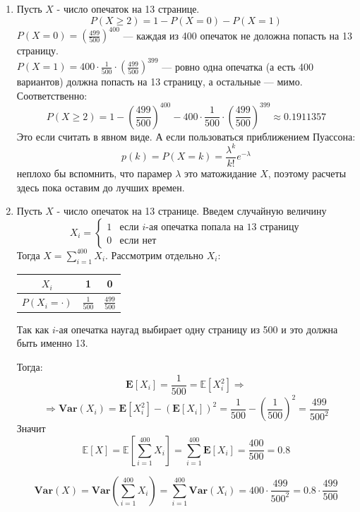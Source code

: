 \documentclass[a4paper,12pt]{article}
\theoremstyle{plain}                         %
\theoremstyle{definition}                  %
\theoremstyle{remark}                      %
\begin{document}
\begin{enumerate}
\item Пусть $X$ - число опечаток на 13 странице. $$P(X \geqslant 2) = 1 - P(X=0) - P(X=1) $$
$P(X=0) = \left( \frac{499}{500} \right)^{400}$ --- каждая из 400 опечаток не доложна попасть на 13 страницу.\\
$P(X=1) = 400\cdot\frac{1}{500}\cdot\left( \frac{499}{500} \right)^{399}$ --- ровно одна опечатка (а есть 400 вариантов) должна попасть на 13 страницу, а остальные --- мимо. Соответственно:
$$
P(X \geqslant 2) = 1 - \left( \frac{499}{500} \right)^{400} - 400\cdot\frac{1}{500}\cdot\left( \frac{499}{500} \right)^{399} \approx 0.1911357
$$
Это если считать в явном виде. А если пользоваться приближением Пуассона: 
$$
p(k) = P(X = k) = \frac{\lambda^k}{k!}e^{-\lambda}
$$
неплохо бы вспомнить, что парамер $\lambda$ это матожидание $X$, поэтому расчеты здесь пока оставим до лучших времен.

\item Пусть $X$ - число опечаток на 13 странице. Введем случайную величину 
$$X_i =
\begin{cases}
1 & \text{если } i\text{-ая опечатка попала на 13 страницу}\\
0 & \text{если нет}
\end{cases}
$$
Тогда $X = \sum\limits_{i=1}^{400}X_i$. Рассмотрим отдельно $X_i$: \hspace{0.5cm}
\begin{minipage}{0.3\linewidth}

\begin{tabular}{c|c|c}
$X_i$ & 1 & 0 \\
\hline
$P(X_i = \cdot)$ & $\frac{1}{500} $ & $\frac{499}{500}$
\end{tabular}
\end{minipage}


Так как $i$-ая опечатка наугад выбирает одну страницу из 500 и это должна быть именно 13. 

Тогда:
$$
\mathbf{E}[X_i] = \frac{1}{500} = \mathbb{E}[X^2_i] \Rightarrow 
$$
$$
\Rightarrow \mathbf{Var}(X_i) = \mathbf{E}[X^2_i] - (\mathbf{E}[X_i])^2 = \frac{1}{500} - \left(\frac{1}{500}\right)^2 = \frac{499}{500^2}
$$
Значит 
$$
\mathbb{E}[X] = \mathbb{E}\left[\sum\limits_{i=1}^{400}X_i\right] = \sum\limits_{i=1}^{400}\mathbf{E}[X_i]  = \frac{400}{500} = 0.8
$$

$$
\mathbf{Var}(X) = \mathbf{Var}\left(\sum\limits_{i=1}^{400}X_i\right) = \sum\limits_{i=1}^{400}\mathbf{Var}(X_i) = 400\cdot\frac{499}{500^2} = 0.8\cdot\frac{499}{500}
$$


\end{enumerate}
\end{document}
